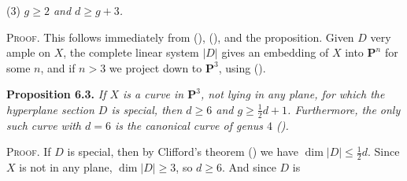 {\noindent\hspace*{1em}(3) \emph{$g\ge2$ and $d\ge g+3$.}

\smallskip
\noindent\textsc{Proof.} This follows immediately from (), (), and the proposition. Given $D$ very ample on $X$, the complete linear system $|D|$ gives an embedding of $X$ into $\mathbf P^n$ for some $n$, and if $n>3$ we project down to $\mathbf P^3$, using ().

\medskip
\noindent\hypertarget{result-IV-6.3}{}\textbf{Proposition 6.3.} \emph{If $X$ is a curve in $\mathbf P^3$, not lying in any plane, for which the hyperplane section $D$ is special, then $d\ge6$ and $g\ge\frac12d+1$. Furthermore, the only such curve with $d=6$ is the canonical curve of genus $4$ ().}

\smallskip
\noindent\textsc{Proof.} If $D$ is special, then by Clifford's theorem () we have $\dim|D|\le\frac12d$. Since $X$ is not in any plane, $\dim|D|\ge3$, so $d\ge6$. And since $D$ is}
